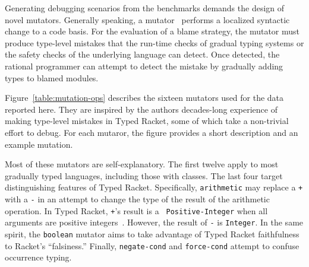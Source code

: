 Generating debugging scenarios from the benchmarks demands the design
of novel mutators. Generally speaking, a
mutator~\cite{jia2011analysis,demillo1978hints,lipton1971fault}
performs a localized syntactic change to a code basis. For the
evaluation of a blame strategy, the mutator must produce type-level
mistakes that the run-time checks of gradual typing systems or the
safety checks of the underlying language can detect. Once detected,
the rational programmer can attempt to detect the mistake by gradually
adding types to blamed modules.

Figure~\ref{table:mutation-ops} describes the sixteen mutators used
for the data reported here. They are inspired by the authors
decades-long experience of making type-level mistakes in Typed Racket,
some of which take a non-trivial effort to debug.  For each mutaror,
the figure provides a short description and an example mutation.

Most of these mutators are self-explanatory.  The first twelve apply
to most gradually typed languages, including those with classes.  The
last four target distinguishing features of Typed Racket.
Specifically, {\tt arithmetic} may replace a {\tt +} with a {\tt -} in
an attempt to change the type of the result of the arithmetic
operation. In Typed Racket, {\tt +}'s result is a {\tt
Positive-Integer} when all arguments are positive
integers~\cite{stathff-padl-12}. However, the result of {\tt -}
is {\tt Integer}. In the same spirit, the {\tt boolean} mutator aims
to take advantage of Typed Racket faithfulness to Racket's
``falsiness.'' Finally, {\tt negate-cond} and {\tt force-cond} attempt
to confuse occurrence typing.
